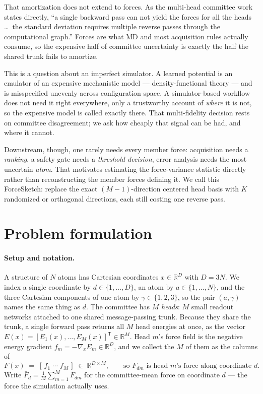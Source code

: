 \documentclass{article}
\begin{document}
That amortization does not extend to forces. As the multi-head committee work states directly, ``a
single backward pass can not yield the forces for all the heads \ldots\ the standard deviation
requires multiple reverse passes through the computational graph.'' Forces are what MD and most
acquisition rules actually consume, so the expensive half of committee uncertainty is exactly the
half the shared trunk fails to amortize.

This is a question about an imperfect simulator. A learned potential is an emulator of an expensive
mechanistic model --- density-functional theory --- and is misspecified unevenly across configuration
space. A simulator-based workflow does not need it right everywhere, only a trustworthy account of
\emph{where} it is not, so the expensive model is called exactly there. That multi-fidelity decision
rests on committee disagreement; we ask how cheaply that signal can be had, and where it cannot.

Downstream, though, one rarely needs every member force: acquisition needs a \emph{ranking}, a safety
gate needs a \emph{threshold decision}, error analysis needs the most uncertain \emph{atom}. That
motivates estimating the force-variance statistic directly rather than reconstructing the member
forces defining it. We call this ForceSketch: replace the exact $(M{-}1)$-direction centered head
basis with $K$ randomized or orthogonal directions, each still costing one reverse pass.

\section{Problem formulation}
\label{sec:problem}
\paragraph{Setup and notation.}
A structure of $N$ atoms has Cartesian coordinates $x\in\mathbb{R}^{D}$ with $D=3N$. We index a
single coordinate by $d\in\{1,\dots,D\}$, an atom by $a\in\{1,\dots,N\}$, and the three Cartesian
components of one atom by $\gamma\in\{1,2,3\}$, so the pair $(a,\gamma)$ names the same thing as $d$.
The committee has $M$ \emph{heads}: $M$ small readout networks attached to one shared
message-passing trunk. Because they share the trunk, a single forward pass returns all $M$ head
energies at once, as the vector
$E(x)=[E_1(x),\dots,E_M(x)]^{\mathsf T}\in\mathbb{R}^{M}$. Head $m$'s force field is the negative
energy gradient $f_m=-\nabla_x E_m\in\mathbb{R}^{D}$, and we collect the $M$ of them as the columns
of
\begin{equation*}
F(x)\;=\;[\,f_1\;\cdots\;f_M\,]\;\in\;\mathbb{R}^{D\times M},
\qquad\text{so } F_{dm} \text{ is head } m\text{'s force along coordinate } d .
\end{equation*}
Write $\bar F_d=\tfrac1M\sum_{m=1}^{M}F_{dm}$ for the committee-mean force on coordinate $d$ --- the
force the simulation actually uses.
\end{document}

